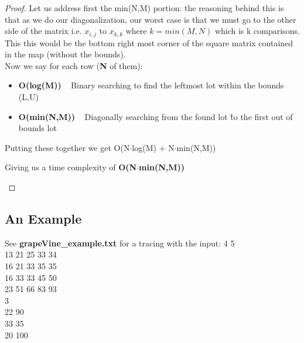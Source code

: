 \documentclass[12pt]{article}
\begin{document}
\begin{proof}
Let us address first the min(N,M) portion: the reasoning behind this is that as we do our diagonalization,
our worst case is that we must go to the other side of the matrix i.e. $x_{i,j}$ to $x_{k,k}$ where $k = min(M,N)$
which is k comparisons. This this would be the bottom right most corner of the square matrix contained in the map
(without the bounds). \\
Now we say for each row (\textbf{N} of them):
\begin{itemize}
    \item \textbf{O(log(M))} ~ Binary searching to find the leftmost lot within the bounds (L,U)
    \item \textbf{O(min(N,M))} ~ Diagonally searching from the found lot \^ to the first out of bounds lot
\end{itemize}
Putting these together we get O(N$\cdot$log(M) + N$\cdot$min(N,M))
\begin{center}
    Giving us a time complexity of \textbf{O(N$\cdot$min(N,M))}
\end{center}
\end{proof}


\subsection{An Example}
See \textbf{grapeVine\_example.txt} for a tracing with the input:
4 5 \\
13 21 25 33 34 \\
16 21 33 35 35 \\
16 33 33 45 50 \\
23 51 66 83 93 \\
3 \\
22 90  \\
33 35  \\
20 100 \\



\end{document}
